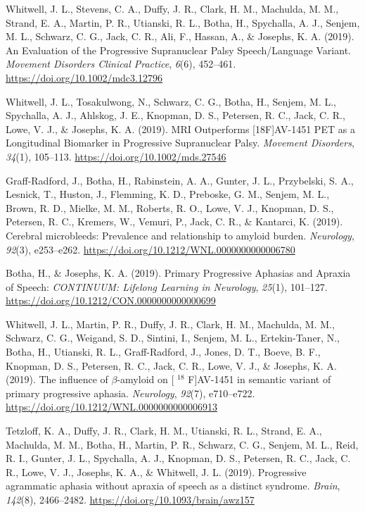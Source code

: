 \documentclass[11pt, a4paper]{awesome-cv}
\begin{document}
\leavevmode\hypertarget{ref-whitwell_evaluation_2019}{}%
Whitwell, J. L., Stevens, C. A., Duffy, J. R., Clark, H. M., Machulda,
M. M., Strand, E. A., Martin, P. R., Utianski, R. L., Botha, H.,
Spychalla, A. J., Senjem, M. L., Schwarz, C. G., Jack, C. R., Ali, F.,
Hassan, A., \& Josephs, K. A. (2019). An {Evaluation} of the
{Progressive} {Supranuclear} {Palsy} {Speech}/{Language} {Variant}.
\emph{Movement Disorders Clinical Practice}, \emph{6}(6), 452--461.
\url{https://doi.org/10.1002/mdc3.12796}

\leavevmode\hypertarget{ref-whitwell_mri_2019}{}%
Whitwell, J. L., Tosakulwong, N., Schwarz, C. G., Botha, H., Senjem, M.
L., Spychalla, A. J., Ahlskog, J. E., Knopman, D. S., Petersen, R. C.,
Jack, C. R., Lowe, V. J., \& Josephs, K. A. (2019). {MRI} {Outperforms}
{[}{18F}{]}{AV}-1451 {PET} as a {Longitudinal} {Biomarker} in
{Progressive} {Supranuclear} {Palsy}. \emph{Movement Disorders},
\emph{34}(1), 105--113. \url{https://doi.org/10.1002/mds.27546}

\leavevmode\hypertarget{ref-graff-radford_cerebral_2019}{}%
Graff-Radford, J., Botha, H., Rabinstein, A. A., Gunter, J. L.,
Przybelski, S. A., Lesnick, T., Huston, J., Flemming, K. D., Preboske,
G. M., Senjem, M. L., Brown, R. D., Mielke, M. M., Roberts, R. O., Lowe,
V. J., Knopman, D. S., Petersen, R. C., Kremers, W., Vemuri, P., Jack,
C. R., \& Kantarci, K. (2019). Cerebral microbleeds: {Prevalence} and
relationship to amyloid burden. \emph{Neurology}, \emph{92}(3),
e253--e262. \url{https://doi.org/10.1212/WNL.0000000000006780}

\leavevmode\hypertarget{ref-botha_primary_2019}{}%
Botha, H., \& Josephs, K. A. (2019). Primary {Progressive} {Aphasias}
and {Apraxia} of {Speech}: \emph{CONTINUUM: Lifelong Learning in
Neurology}, \emph{25}(1), 101--127.
\url{https://doi.org/10.1212/CON.0000000000000699}

\leavevmode\hypertarget{ref-whitwell_influence_2019}{}%
Whitwell, J. L., Martin, P. R., Duffy, J. R., Clark, H. M., Machulda, M.
M., Schwarz, C. G., Weigand, S. D., Sintini, I., Senjem, M. L.,
Ertekin-Taner, N., Botha, H., Utianski, R. L., Graff-Radford, J., Jones,
D. T., Boeve, B. F., Knopman, D. S., Petersen, R. C., Jack, C. R., Lowe,
V. J., \& Josephs, K. A. (2019). The influence of \(\beta\)-amyloid on
{[} \(^{\textrm{18}}\) {F}{]}{AV}-1451 in semantic variant of primary
progressive aphasia. \emph{Neurology}, \emph{92}(7), e710--e722.
\url{https://doi.org/10.1212/WNL.0000000000006913}

\leavevmode\hypertarget{ref-tetzloff_progressive_2019}{}%
Tetzloff, K. A., Duffy, J. R., Clark, H. M., Utianski, R. L., Strand, E.
A., Machulda, M. M., Botha, H., Martin, P. R., Schwarz, C. G., Senjem,
M. L., Reid, R. I., Gunter, J. L., Spychalla, A. J., Knopman, D. S.,
Petersen, R. C., Jack, C. R., Lowe, V. J., Josephs, K. A., \& Whitwell,
J. L. (2019). Progressive agrammatic aphasia without apraxia of speech
as a distinct syndrome. \emph{Brain}, \emph{142}(8), 2466--2482.
\url{https://doi.org/10.1093/brain/awz157}
\end{document}
